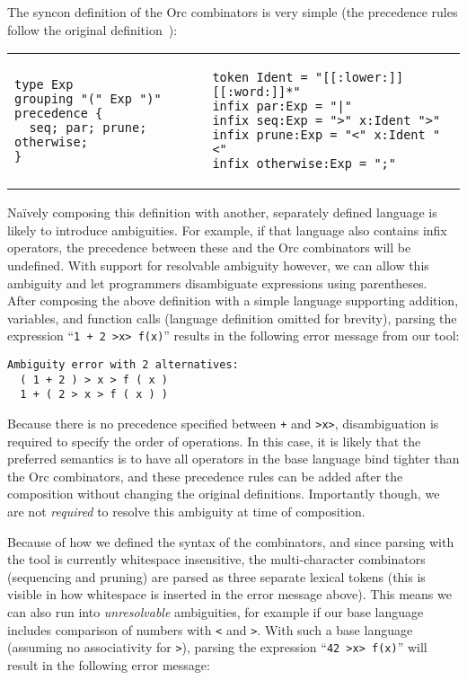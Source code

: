 \documentclass[acmsmall,review,anonymous]{acmart}\settopmatter{printfolios=true,printccs=false,printacmref=false}
\newcommand{\ocaml}{\lstinline[language={[objective]caml}]}
\begin{document}
The syncon definition of the Orc combinators is very simple (the
precedence rules follow the original
definition~\cite{kitchinOrc2009}):

\begin{tabular}{ll}
\begin{lstlisting}[language=syncon,boxpos=t]
type Exp
grouping "(" Exp ")"
precedence {
  seq; par; prune; otherwise;
}
\end{lstlisting}
&
\begin{lstlisting}[language=syncon,boxpos=t]
token Ident = "[[:lower:]][[:word:]]*"
infix par:Exp = "|"
infix seq:Exp = ">" x:Ident ">"
infix prune:Exp = "<" x:Ident "<"
infix otherwise:Exp = ";"
\end{lstlisting}
\end{tabular}\smallskip

\noindent
Na\"{i}vely composing this definition with another, separately
defined language is likely to introduce ambiguities. For example,
if that language also contains infix operators, the precedence
between these and the Orc combinators will be undefined. With
support for resolvable ambiguity however, we can allow this
ambiguity and let programmers disambiguate expressions using
parentheses. After composing the above definition with a simple
language supporting addition, variables, and function calls
(language definition omitted for brevity), parsing the expression
%
``\ocaml{1 + 2 >x> f(x)}''
%
results in the following error message from our tool:

\begin{lstlisting}[language={[objective]caml}]
Ambiguity error with 2 alternatives:
  ( 1 + 2 ) > x > f ( x )
  1 + ( 2 > x > f ( x ) )
\end{lstlisting}

\noindent
Because there is no precedence specified between \ocaml{+} and
\ocaml{>x>}, disambiguation is required to specify the order of
operations.
%
In this case, it is likely that the preferred semantics is to have
all operators in the base language bind tighter than the Orc
combinators, and these precedence rules can be added after the
composition without changing the original definitions. Importantly
though, we are not \emph{required} to resolve this ambiguity at
time of composition.

Because of how we defined the syntax of the combinators, and since
parsing with the tool is currently whitespace insensitive, the
multi-character combinators (sequencing and pruning) are parsed as
three separate lexical tokens (this is visible in how whitespace
is inserted in the error message above). This means we can also
run into \emph{unresolvable} ambiguities, for example if our base
language includes comparison of numbers with \ocaml{<} and
\ocaml{>}. With such a base language (assuming no associativity
for \ocaml{>}), parsing the expression
%
``\ocaml{42 >x> f(x)}''
%
will result in the following error message:
\end{document}

